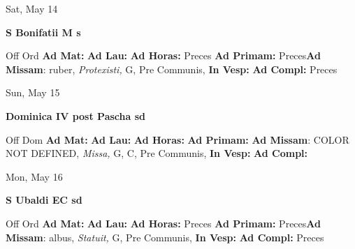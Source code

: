 \documentclass[10pt]{memoir}
\begin{document}
\begin{center}
\begin{minipage}{3.5in}
\vspace{2em}
\begin{center}Sat, May 14
\end{center}
\textbf{ \large S Bonifatii M
\textnormal{\normalsize s}}

\begin{justify}Off Ord
\textbf{Ad Mat: }
\textbf{Ad Lau: }
\textbf{Ad Horas: }Preces
\textbf{Ad Primam: }Preces\textbf{Ad Missam}: ruber, \textit{Protexisti,} G, Pre Communis, 
\textbf{In Vesp: }
\textbf{Ad Compl: }Preces
\end{justify}
\end{minipage}
\end{center}

\begin{center}
\begin{minipage}{3.5in}
\vspace{2em}
\begin{center}Sun, May 15
\end{center}
\textbf{ \large Dominica IV post Pascha
\textnormal{\normalsize sd}}

\begin{justify}Off Dom
\textbf{Ad Mat: }
\textbf{Ad Lau: }
\textbf{Ad Horas: }
\textbf{Ad Primam: }\textbf{Ad Missam}: COLOR NOT DEFINED, \textit{Missa,} G, C, Pre Communis, 
\textbf{In Vesp: }
\textbf{Ad Compl: }
\end{justify}
\end{minipage}
\end{center}

\begin{center}
\begin{minipage}{3.5in}
\vspace{2em}
\begin{center}Mon, May 16
\end{center}
\textbf{ \large S Ubaldi EC
\textnormal{\normalsize sd}}

\begin{justify}Off Ord
\textbf{Ad Mat: }
\textbf{Ad Lau: }
\textbf{Ad Horas: }Preces
\textbf{Ad Primam: }Preces\textbf{Ad Missam}: albus, \textit{Statuit,} G, Pre Communis, 
\textbf{In Vesp: }
\textbf{Ad Compl: }Preces
\end{justify}
\end{minipage}
\end{center}
\end{document}

